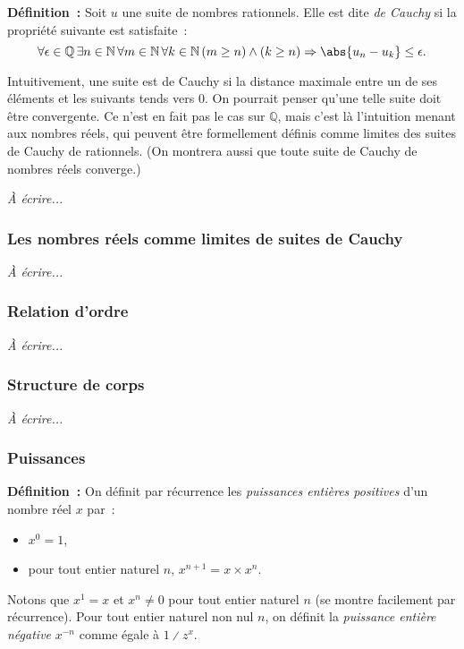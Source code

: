 \noindent\textbf{Définition :} Soit $u$ une suite de nombres rationnels. 
    Elle est dite \textit{de Cauchy} si la propriété suivante est satisfaite : 
    \begin{equation*}
        \forall \epsilon \in \mathbb{Q} \, 
        \exists n \in \mathbb{N} \,
        \forall m \in \mathbb{N} \,
        \forall k \in \mathbb{N} \,
        (m \geq n) \wedge (k \geq n)
        \Rightarrow \abs{u_n - u_k} \leq \epsilon
        .
    \end{equation*}

\medskip

Intuitivement, une suite est de Cauchy si la distance maximale entre un de ses éléments et les suivants tends vers $0$. 
On pourrait penser qu'une telle suite doit être convergente. 
Ce n'est en fait pas le cas sur $\mathbb{Q}$, mais c'est là l'intuition menant aux nombres réels, qui peuvent être formellement définis comme limites des suites de Cauchy de rationnels. 
(On montrera aussi que toute suite de Cauchy de nombres réels converge.)

\medskip

\emph{À écrire...}

\subsubsection{Les nombres réels comme limites de suites de Cauchy}

\emph{À écrire...}

\subsubsection{Relation d'ordre}

\emph{À écrire...}

\subsubsection{Structure de corps}

\emph{À écrire...}

\subsubsection{Puissances}

\noindent\textbf{Définition :} On définit par récurrence les \emph{puissances entières positives} d'un nombre réel $x$ par :
    \begin{itemize}[nosep]
        \item $x^0 = 1$,
        \item pour tout entier naturel $n$, $x^{n+1} = x \times x^n$.
    \end{itemize}
    Notons que $x^1 = x$ et $x^n \neq 0$ pour tout entier naturel $n$ (se montre facilement par récurrence).
    Pour tout entier naturel non nul $n$, on définit la \emph{puissance entière négative} $x^{-n}$ comme égale à $1 \divslash z^x$.

